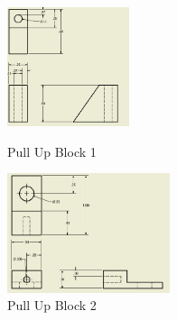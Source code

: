 \documentclass{article}
\begin{document}
\begin{figure}[h!]
\begin{minipage}{.45\textwidth}
    \centering
    \includegraphics[height=3.5cm]{24_02-11/images/PullUpBlock1.PNG}
    \caption{Pull Up Block 1}
    \label{fig:PullUp1}
\end{minipage}\hfill

\begin{minipage}{.45\textwidth}
\centering
    \includegraphics[height=3.5cm]{24_02-11/images/PullUp2.PNG}
    \caption{Pull Up Block 2}
    \label{fig:PullUp2}
    \end{minipage}
\end{figure}
\end{document}
